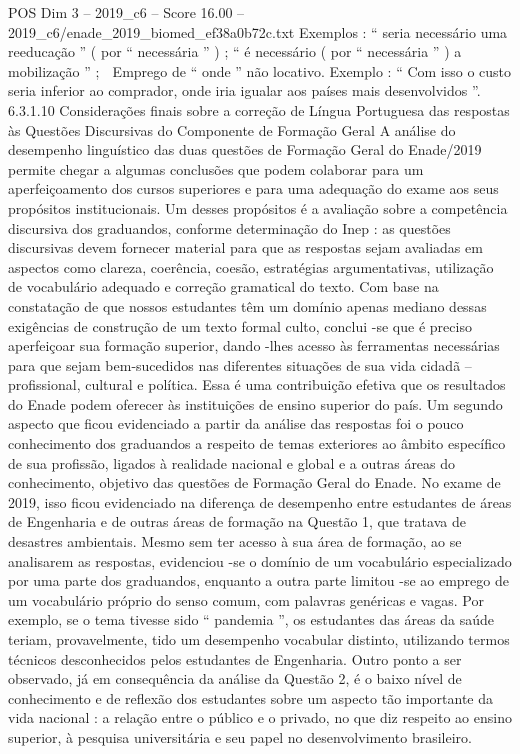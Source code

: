 \begin{textsample}{POS Dim 3 – 2019\_c6 – Score 16.00 – 2019\_c6/enade\_2019\_biomed\_ef38a0b72c.txt}
Exemplos : “ seria necessário uma reeducação ” ( por “ necessária ” ) ; “ é necessário ( por “ necessária ” ) a mobilização ” ;  Emprego de “ onde ” não locativo.
Exemplo : “ Com isso o custo seria inferior ao comprador, onde iria igualar aos países mais desenvolvidos ”. 6.3.1.10 Considerações finais sobre a correção de Língua Portuguesa das respostas às Questões Discursivas do Componente de Formação Geral A análise do desempenho linguístico das duas questões de Formação Geral do Enade/2019 permite chegar a algumas conclusões que podem colaborar para um aperfeiçoamento dos cursos superiores e para uma adequação do exame aos seus propósitos institucionais.
Um desses propósitos é a avaliação sobre a competência discursiva dos graduandos, conforme determinação do Inep : as questões discursivas devem fornecer material para que as respostas sejam avaliadas em aspectos como clareza, coerência, coesão, estratégias argumentativas, utilização de vocabulário adequado e correção gramatical do texto.
Com base na constatação de que nossos estudantes têm um domínio apenas mediano dessas exigências de construção de um texto formal culto, conclui -se que é preciso aperfeiçoar sua formação superior, dando -lhes acesso às ferramentas necessárias para que sejam bem-sucedidos nas diferentes situações de sua vida cidadã – profissional, cultural e política.
Essa é uma contribuição efetiva que os resultados do Enade podem oferecer às instituições de ensino superior do país.
Um segundo aspecto que ficou evidenciado a partir da análise das respostas foi o pouco conhecimento dos graduandos a respeito de temas exteriores ao âmbito específico de sua profissão, ligados à realidade nacional e global e a outras áreas do conhecimento, objetivo das questões de Formação Geral do Enade.
No exame de 2019, isso ficou evidenciado na diferença de desempenho entre estudantes de áreas de Engenharia e de outras áreas de formação na Questão 1, que tratava de desastres ambientais.
Mesmo sem ter acesso à sua área de formação, ao se analisarem as respostas, evidenciou -se o domínio de um vocabulário especializado por uma parte dos graduandos, enquanto a outra parte limitou -se ao emprego de um vocabulário próprio do senso comum, com palavras genéricas e vagas.
Por exemplo, se o tema tivesse sido “ pandemia ”, os estudantes das áreas da saúde teriam, provavelmente, tido um desempenho vocabular distinto, utilizando termos técnicos desconhecidos pelos estudantes de Engenharia.
Outro ponto a ser observado, já em consequência da análise da Questão 2, é o baixo nível de conhecimento e de reflexão dos estudantes sobre um aspecto tão importante da vida nacional : a relação entre o público e o privado, no que diz respeito ao ensino superior, à pesquisa universitária e seu papel no desenvolvimento brasileiro.

\end{textsample}
